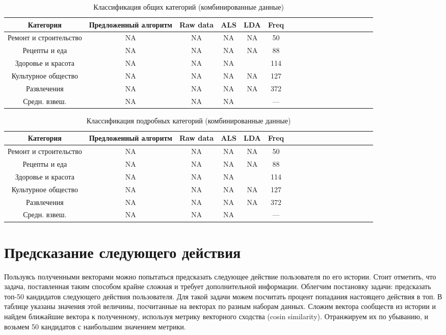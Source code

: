 \documentclass[times,specification,annotation]{itmo-student-thesis}
\begin{document}
\begin{table}[!h]
\caption{Классификация общих категорий (комбинированные данные)}\label{tab-combined-g}
\centering
\begin{tabular}{|*{18}{c|}}\hline
Категория & Предложенный алгоритм  & Raw data & ALS & LDA & Freq \\\hline
Ремонт и строительство            & NA & NA & NA & NA & 50 \\\hline
Рецепты и еда            & NA & NA & NA & NA & 88 \\\hline
Здоровье и красота             & NA & NA & NA &  & 114 \\\hline
Культурное общество            & NA & NA & NA &NA   & 127  \\\hline
Развлечения              & NA & NA & NA & NA & 372 \\\hline
Средн. взвеш.  & NA & NA & NA &  & --- \\\hline
\end{tabular}
\end{table}

\begin{table}[!h]
\caption{Классификация подробных категорий (комбинированные данные)}\label{tab-combined-d}
\centering
\begin{tabular}{|*{18}{c|}}\hline
Категория & Предложенный алгоритм  & Raw data & ALS & LDA & Freq \\\hline
Ремонт и строительство            & NA & NA & NA & NA & 50 \\\hline
Рецепты и еда            & NA & NA & NA & NA & 88 \\\hline
Здоровье и красота             & NA & NA & NA &  & 114 \\\hline
Культурное общество            & NA & NA & NA &NA   & 127  \\\hline
Развлечения              & NA & NA & NA & NA & 372 \\\hline
Средн. взвеш.  & NA & NA & NA &  & --- \\\hline
\end{tabular}
\end{table}


\section{Предсказание следующего действия}\label{sec:next-action}
Пользуясь полученными векторами можно попытаться предсказать следующее действие пользователя по его истории. Стоит отметить, что задача, поставленная таким способом крайне сложная и требует дополнительной информации. Облегчим постановку задачи: предсказать топ-50 кандидатов следующего действия пользователя. Для такой задачи можем посчитать процент попадания настоящего действия в топ. В таблице указаны значения этой величины, посчитанные на векторах по разным наборам данных. Сложим вектора сообществ из истории и найдем ближайшие вектора к полученному, используя метрику векторного сходства (cosin similarity). Отранжируем их по убыванию, и возьмем 50 кандидатов с наибольшим значением метрики.
\end{document}
